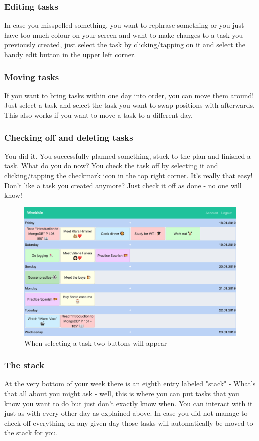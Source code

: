 \subsubsection{Editing tasks}
In case you misspelled something, you want to rephrase something or you just have too much colour on your screen and want to make changes to a task you previously created, just select the task by clicking/tapping on it and select the handy edit button in the upper left corner. 
\subsubsection{Moving tasks}
If you want to bring tasks within one day into order, you can move them around! Just select a task and select the task you want to swap positions with afterwards. 
This also works if you want to move a task to a different day. 
\subsubsection{Checking off and deleting tasks}
You did it. You successfully planned something, stuck to the plan and finished a task. What do you do now? You check the task off by selecting it and clicking/tapping the checkmark icon in the top right corner. It's really that easy! \\
Don't like a task you created anymore? Just check it off as done - no one will know!

\begin{figure}[H] 
	\centering 
	\includegraphics[width=14cm]{figures/user_docu_selected_task_desktop.png}   
	\caption[WeekMe account page]{When selecting a task two buttons will appear}       
	\label{fig: Selected task on desktop}     
\end{figure}  

\subsubsection{The stack} 
At the very bottom of your week there is an eighth entry labeled "stack" - What's that all about you might ask - well, this is where you can put tasks that you know you want to do but just don't exactly know when.  You can interact with it just as with every other day as explained above.  
In case you did not manage to check off everything on any given day those tasks will automatically be moved to the stack for you.